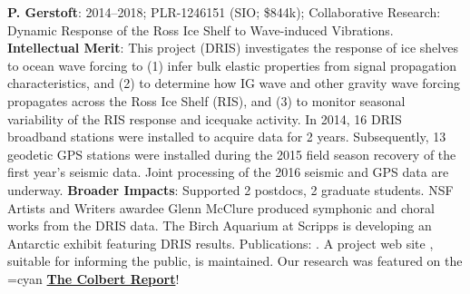 {\bf  P. Gerstoft}: 2014--2018; PLR-1246151 (SIO; \$844k); Collaborative Research: Dynamic Response of the Ross Ice Shelf to Wave-induced Vibrations. {\bf Intellectual Merit}: This project (DRIS) investigates the response of ice shelves to ocean wave forcing to (1) infer bulk elastic properties from signal propagation characteristics, and (2) to determine how IG wave and other gravity wave forcing propagates across the Ross Ice Shelf (RIS), and (3) to monitor seasonal variability of the RIS response and icequake activity. In 2014, 16 DRIS broadband stations were installed to acquire data for 2 years. Subsequently, 13 geodetic GPS stations were installed during the 2015 field season recovery of the first year’s seismic data. Joint processing of the 2016 seismic and GPS data are underway. {\bf Broader Impacts}: Supported 2 postdocs, 2 graduate students. NSF Artists and Writers awardee Glenn McClure produced symphonic and choral works from the DRIS data. The Birch Aquarium at Scripps is developing an Antarctic exhibit featuring DRIS results. Publications: \cite{bromirski2015,diez2016,bromirski2017,chen2018,shen2018,chaput2018,white2019}. 
A project web site , suitable for informing the public, is maintained. 
Our research was featured on the \urlcolor=cyan
\href{https://www.youtube.com/watch?v=djesneud0Yg&fbclid=IwAR1zgpupmvZv2lFUy2ce2bLAgpIvi0M7OBW7P0koa0VwpwfMg5-8Pyg9hwE&app=desktop}{\bf The Colbert Report}!



